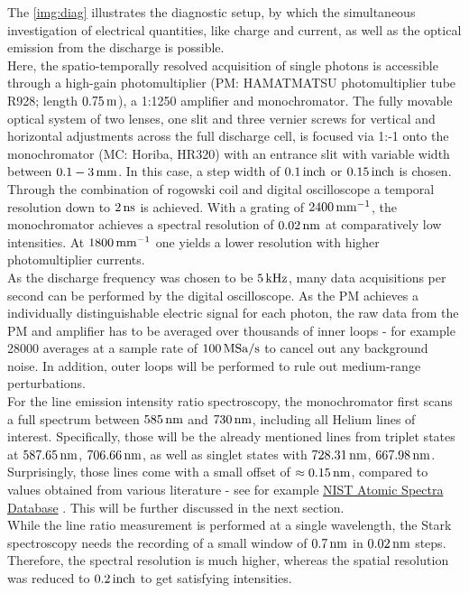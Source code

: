 \documentclass[a4paper,10pt,twoside]{article}
\begin{document}
			The \autoref{img:diag} illustrates the diagnostic setup, by which the simultaneous investigation of electrical quantities, like charge and current, as well as the optical emission from the discharge is possible.\\		
			Here, the spatio-temporally resolved acquisition of single photons is accessible through a high-gain photomultiplier (PM: HAMATMATSU photomultiplier tube R928; length $\unit[0.75]{m}$), a 1:1250 amplifier and monochromator. The fully movable optical system of two lenses, one slit and three vernier screws for vertical and horizontal adjustments across the full discharge cell, is focused via 1:-1 onto the monochromator (MC: Horiba, HR320) with an entrance slit with variable width between $\unit[0.1-3]{mm}$. In this case, a step width of $\unit[0.1]{inch}$ or $\unit[0.15]{inch}$ is chosen. Through the combination of rogowski coil and digital oscilloscope a temporal resolution down to $\unit[2]{ns}$ is achieved. With a grating of $\unit[2400]{mm^{-1}}$, the monochromator achieves a spectral resolution of $\unit[0.02]{nm}$ at comparatively low intensities. At $\unit[1800]{mm^{-1}}$ one yields a lower resolution with higher photomultiplier currents.\\
			As the discharge frequency was chosen to be $\unit[5]{kHz}$, many data acquisitions per second can be performed by the digital oscilloscope. As the PM achieves a individually distinguishable electric signal for each photon, the raw data from the PM and amplifier has to be averaged over thousands of inner loops - for example 28000 averages at a sample rate of $\unit[100]{MSa/s}$ to cancel out any background noise. In addition, outer loops will be performed to rule out medium-range perturbations.\\
			For the line emission intensity ratio spectroscopy, the monochromator first scans a full spectrum between $\unit[585]{nm}$ and $\unit[730]{nm}$, including all Helium lines of interest. Specifically, those will be the already mentioned lines from triplet states at $\unit[587.65]{nm}$, $\unit[706.66]{nm}$, as well as singlet states with $\unit[728.31]{nm}$, $\unit[667.98]{nm}$. Surprisingly, those lines come with a small offset of $\approx\unit[0.15]{nm}$, compared to values obtained from various literature - see for example \href{http://www.nist.gov/pml/data/asd.cfm}{NIST Atomic Spectra Database} \cite{NIST_ASD}. This will be further discussed in the next section.\\
			While the line ratio measurement is performed at a single wavelength, the Stark spectroscopy needs the recording of a small window of $\unit[0.7]{nm}$ in $\unit[0.02]{nm}$ steps. Therefore, the spectral resolution is much higher, whereas the spatial resolution was reduced to $\unit[0.2]{inch}$ to get satisfying intensities.\\
\end{document}
